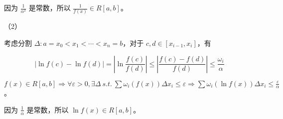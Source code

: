 因为 $\displaystyle \frac{1}{\alpha ^{2}}$ 是常数，所以 $\displaystyle \frac{1}{f( x)} \in R[ a,b]$。





（2）

考虑分割 $\displaystyle \Delta :a=x_{0} < x_{1} < \cdots < x_{n} =b$，对于 $\displaystyle c,d\in [ x_{i-1} ,x_{i}]$，有


\begin{equation*}
| \ln f( c) -\ln f( d)| =\left| \ln\frac{f( c)}{f( d)}\right| \leqslant \left| \frac{f( c) -f( d)}{f( d)}\right| \leqslant \frac{\omega _{i}}{\alpha }
\end{equation*}


$\displaystyle f( x) \in R[ a,b] \Rightarrow \forall \varepsilon  >0,\exists \Delta \ s.t.\ \sum \omega _{i}( f( x)) \Delta x_{i} \leqslant \varepsilon \Rightarrow \sum \omega _{i}(\ln f( x)) \Delta x_{i} \leqslant \frac{\varepsilon }{\alpha }$。

因为 $\displaystyle \frac{1}{\alpha }$ 是常数，所以 $\displaystyle \ln f( x) \in R[ a,b]$。










\ifx\allfiles\undefined

\fi